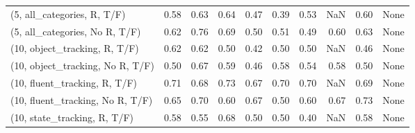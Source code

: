 \begin{table*}[h!]
\begin{adjustbox}{width=2\columnwidth,center}
\begin{tabular}{lrrr|rrr|rrr}
(5, all\_categories, R, T/F)          &                      0.58 &                  0.63 &                      0.64 &                          0.47 &                      0.39 &                          0.53 &                                    NaN &                               0.60 &                                  None \\
(5, all\_categories, No R, T/F)       &                      0.62 &                  0.76 &                      0.69 &                          0.50 &                      0.51 &                          0.49 &                                   0.60 &                               0.63 &                                  None \\



\midrule
(10, object\_tracking, R, T/F)         &                      0.62 &                  0.62 &                      0.50 &                          0.42 &                      0.50 &                          0.50 &                                    NaN &                               0.46 &                                  None \\
(10, object\_tracking, No R, T/F)      &                      0.50 &                  0.67 &                      0.59 &                          0.46 &                      0.58 &                          0.54 &                                   0.58 &                               0.50 &                                  None \\
(10, fluent\_tracking, R, T/F)         &                      0.71 &                  0.68 &                      0.73 &                          0.67 &                      0.70 &                          0.70 &                                    NaN &                               0.69 &                                  None \\
(10, fluent\_tracking, No R, T/F)      &                      0.65 &                  0.70 &                      0.60 &                          0.67 &                      0.50 &                          0.60 &                                   0.67 &                               0.73 &                                  None \\
(10, state\_tracking, R, T/F)          &                      0.58 &                  0.55 &                      0.68 &                          0.50 &                      0.50 &                          0.40 &                                    NaN &                               0.58 &                                  None \\

\end{tabular}
\end{adjustbox}
\end{table*}
